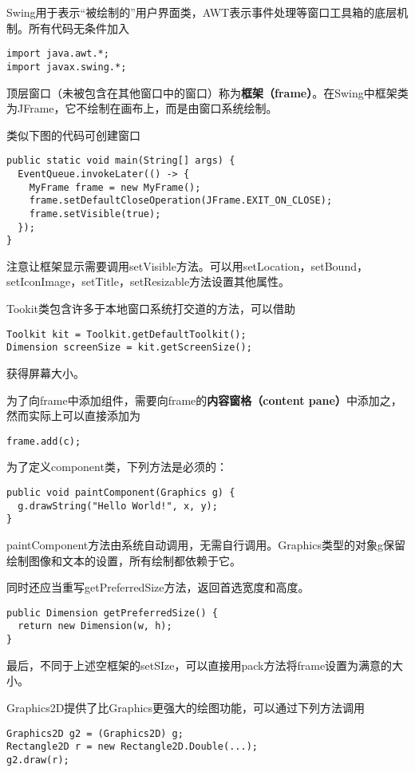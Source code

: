 \documentclass{ctexart}
\newcommand{\term}[2]{\textbf{#1（#2）}}
\begin{document}
Swing用于表示“被绘制的”用户界面类，AWT表示事件处理等窗口工具箱的底层机制。所有代码无条件加入
\begin{lstlisting}
import java.awt.*;
import javax.swing.*;
\end{lstlisting}
\par
顶层窗口（未被包含在其他窗口中的窗口）称为\term{框架}{frame}。在Swing中框架类为JFrame，它不绘制在画布上，而是由窗口系统绘制。
\par
类似下图的代码可创建窗口
\begin{lstlisting}
public static void main(String[] args) {
  EventQueue.invokeLater(() -> {
    MyFrame frame = new MyFrame();
    frame.setDefaultCloseOperation(JFrame.EXIT_ON_CLOSE);
    frame.setVisible(true);
  });
}
\end{lstlisting}
\par
注意让框架显示需要调用setVisible方法。可以用setLocation，setBound，setIconImage，setTitle，setResizable方法设置其他属性。
\par
Tookit类包含许多于本地窗口系统打交道的方法，可以借助
\begin{lstlisting}
Toolkit kit = Toolkit.getDefaultToolkit();
Dimension screenSize = kit.getScreenSize();
\end{lstlisting}
获得屏幕大小。
\par
为了向frame中添加组件，需要向frame的\term{内容窗格}{content pane}中添加之，然而实际上可以直接添加为
\begin{lstlisting}
frame.add(c);
\end{lstlisting}
\par
为了定义component类，下列方法是必须的：
\begin{lstlisting}
public void paintComponent(Graphics g) {
  g.drawString("Hello World!", x, y);
}
\end{lstlisting}
paintComponent方法由系统自动调用，无需自行调用。Graphics类型的对象g保留绘制图像和文本的设置，所有绘制都依赖于它。
\par
同时还应当重写getPreferredSize方法，返回首选宽度和高度。
\begin{lstlisting}
public Dimension getPreferredSize() {
  return new Dimension(w, h);
}
\end{lstlisting}
\par
最后，不同于上述空框架的setSIze，可以直接用pack方法将frame设置为满意的大小。
\par
Graphics2D提供了比Graphics更强大的绘图功能，可以通过下列方法调用
\begin{lstlisting}
Graphics2D g2 = (Graphics2D) g;
Rectangle2D r = new Rectangle2D.Double(...);
g2.draw(r);
\end{lstlisting}
\end{document}
